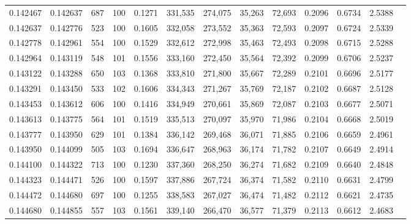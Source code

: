 \begin{tabular}{rrrrrrrrrrrrr}
0.142467 & 0.142637 &   687 & 100 &                                     0.1271 & 331,535 & 274,075 &  35,263 &  72,693 & 0.2096 & 0.6734 & 2.5388 \\
0.142637 & 0.142776 &   523 & 100 &                                     0.1605 & 332,058 & 273,552 &  35,363 &  72,593 & 0.2097 & 0.6724 & 2.5339 \\
0.142778 & 0.142961 &   554 & 100 &                                     0.1529 & 332,612 & 272,998 &  35,463 &  72,493 & 0.2098 & 0.6715 & 2.5288 \\
0.142964 & 0.143119 &   548 & 101 &                                     0.1556 & 333,160 & 272,450 &  35,564 &  72,392 & 0.2099 & 0.6706 & 2.5237 \\
0.143122 & 0.143288 &   650 & 103 &                                     0.1368 & 333,810 & 271,800 &  35,667 &  72,289 & 0.2101 & 0.6696 & 2.5177 \\
0.143291 & 0.143450 &   533 & 102 &                                     0.1606 & 334,343 & 271,267 &  35,769 &  72,187 & 0.2102 & 0.6687 & 2.5128 \\
0.143453 & 0.143612 &   606 & 100 &                                     0.1416 & 334,949 & 270,661 &  35,869 &  72,087 & 0.2103 & 0.6677 & 2.5071 \\
0.143613 & 0.143775 &   564 & 101 &                                     0.1519 & 335,513 & 270,097 &  35,970 &  71,986 & 0.2104 & 0.6668 & 2.5019 \\
0.143777 & 0.143950 &   629 & 101 &                                     0.1384 & 336,142 & 269,468 &  36,071 &  71,885 & 0.2106 & 0.6659 & 2.4961 \\
0.143950 & 0.144099 &   505 & 103 &                                     0.1694 & 336,647 & 268,963 &  36,174 &  71,782 & 0.2107 & 0.6649 & 2.4914 \\
0.144100 & 0.144322 &   713 & 100 &                                     0.1230 & 337,360 & 268,250 &  36,274 &  71,682 & 0.2109 & 0.6640 & 2.4848 \\
0.144323 & 0.144471 &   526 & 100 &                                     0.1597 & 337,886 & 267,724 &  36,374 &  71,582 & 0.2110 & 0.6631 & 2.4799 \\
0.144472 & 0.144680 &   697 & 100 &                                     0.1255 & 338,583 & 267,027 &  36,474 &  71,482 & 0.2112 & 0.6621 & 2.4735 \\
0.144680 & 0.144855 &   557 & 103 &                                     0.1561 & 339,140 & 266,470 &  36,577 &  71,379 & 0.2113 & 0.6612 & 2.4683 \\

\end{tabular}
